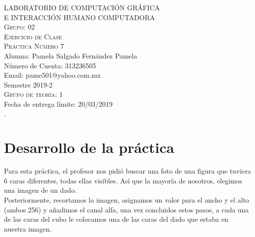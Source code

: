 \documentclass[12pt, a4paper]{article}
\begin{document}
\begin{titlepage}
		{\large LABORATORIO DE COMPUTACIÓN GRÁFICA\\ E INTERACCIÓN HUMANO COMPUTADORA}\\[.4 cm] %
		\textsc{\large Grupo: 02}\\[1.5 cm]
		\textsc{\large Ejercicio de Clase}\\[0.5 cm]
		\textsc{\large Práctica Número 7}\\[1.0 cm]
		{\large Alumna: Pamela Salgado Fernández Pamela}\\[.3 cm]
		{\large Número de Cuenta: 313236505}\\[.3 cm]
		{\large Email: pame501@yahoo.com.mx}\\[1.6 cm]
		\raggedleft 
		{\large Semestre 2019-2}\\[.3 cm]
		\textsc{\large Grupo de teoría: 1}\\[.3 cm]
		{\large Fecha de entrega límite: 20/03/2019}\\[.5 cm].

		
		\vfill %
		 
		
	\end{titlepage}
	\tableofcontents
	\newpage
	\noindent
\section{Desarrollo de la práctica}
\justify
Para esta práctica, el profesor nos pidió buscar una foto de una figura que tuviera 6 caras diferentes, todas ellas visibles. Así que la mayoría de nosotros, elegimos una imagen de un dado.\\[0.3cm]
Posteriormente, recortamos la imagen, asignamos un valor para el ancho y el alto (ambos 256) y añadimos el canal alfa, una vez concluidos estos pasos, a cada una de las caras del cubo le colocamos una de las caras del dado que estaba en nuestra imagen.\\[0.3cm]

\vspace{.15cm}

\justify
\end{document}
